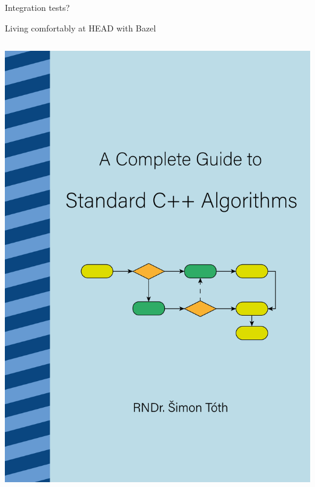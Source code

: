 \documentclass[aspectratio=169]{beamer}
\begin{document}
\begin{frame}{}
    \begin{center}
        \begin{Huge}Integration tests?\end{Huge}
    \end{center}
\end{frame}

\begin{frame}{}
    \begin{center}
        \begin{Huge}Living comfortably at HEAD with Bazel\end{Huge}
    \end{center}
\end{frame}

\begin{frame}{}
    \begin{columns}
        \begin{column}{0.27\textwidth}
            \includegraphics[height=0.8\textheight]{static/book_cover.png}

\end{column}
\end{columns}
\end{frame}
\end{document}
